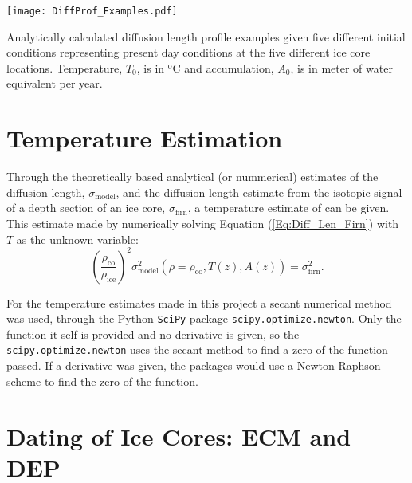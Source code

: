 \documentclass[../../CompleteThesis2/Complete_2ndDraft]{subfiles}
\begin{document}
\begin{marginfigure}
	\centering
	\texttt{[image: DiffProf\_Examples.pdf]}
	\caption[Five different analytical diffusion length profiles]{\footnotesize Analytically calculated diffusion length profile examples given five different initial conditions representing present day conditions at the five different ice core locations. Temperature, $T_0$, is in $^{\text{o}}$C and accumulation, $A_0$, is in meter of water equivalent per year.}
	\label{Fig:DiffProf_Examples}
\end{marginfigure}

\section[Temperature Estimation]{Temperature Estimation}
\label{Sec:Ice_TempEstimation}

Through the theoretically based analytical (or nummerical) estimates of the diffusion length, $\sigma_{\text{model}}$, and the diffusion length estimate from the isotopic signal of a depth section of an ice core, $\sigma_{\text{firn}}$, a temperature estimate of can be given. This estimate made by numerically solving Equation (\ref{Eq:Diff_Len_Firn}) with $T$ as the unknown variable:
\begin{equation}
	\left(\frac{\rho_{\text{co}}}{\rho_{\text{ice}}}\right)^2 \sigma_{\text{model}}^2(\rho=\rho_{\text{co}}, T(z), A(z)) = \sigma^2_{\text{firn}}.
	\label{Eq:Firn_Temp_est_Roots2}
\end{equation}

For the temperature estimates made in this project a secant numerical method\cite{Press2007} was used, through the Python \lstinline[language=Python]|SciPy| package \lstinline[language=Python]|scipy.optimize.newton|. Only the function it self is provided and no derivative is given, so the \lstinline[language=Python]|scipy.optimize.newton| uses the secant method to find a zero of the function passed. If a derivative was given, the packages would use a Newton-Raphson\cite{Press2007} scheme to find the zero of the function.







\section[ECM and DEP][ECM and DEP]{Dating of Ice Cores: ECM and DEP}
\label{Sec:Ice_ECMandDEP}
\end{document}
